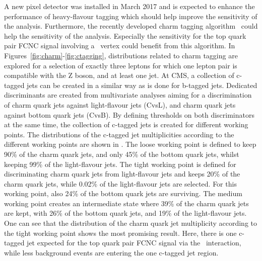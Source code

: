 A new pixel detector was installed in March 2017 and is expected to enhance the performance of heavy-flavour tagging which should help improve the sensitivity of the analysis. Furthermore, the recently developed charm tagging algorithm~\cite{CMS-PAS-BTV-16-001} could help the sensitivity of the analysis.  Especially  the sensitivity for the top quark pair FCNC signal involving a \Zct\ vertex could benefit from this algorithm. In Figures~\ref{fig:charm}-\ref{fig:ctagging},  distributions related to charm tagging are explored for a selection of exactly three leptons for which one lepton pair is compatible with the Z boson, and at least one jet. At CMS, a collection of c-tagged jets can be created in a similar way as is done for b-tagged jets. Dedicated discriminants are created from multivariate analyses aiming for a discrimination of charm quark jets against light-flavour jets (CvsL),  and charm quark jets against bottom quark jets (CvsB). By defining thresholds on both discriminators at the same time, the collection of c-tagged jets is created for different working points. The distributions of the c-tagged jet multiplicities according to the different working points are shown in . The loose working point is defined to keep 90\% of the charm quark jets, and only 45\% of the bottom quark jets, whilst keeping 99\% of the light-flavour jets. The tight working point is defined for discriminating charm quark jets from light-flavour jets and keeps 20\% of the charm quark jets, while 0.02\% of the light-flavour jets are selected. For this working point, also 24\% of the bottom quark jets are surviving. The medium working point creates an intermediate state where 39\% of the charm quark jets are kept, with 26\% of the bottom quark jets, and 19\% of the light-flavour jets. One can see that the distribution of the charm quark jet multiplicity according to the tight working point shows the most promising result. Here, there is one c-tagged jet expected for the top quark pair FCNC signal via the \Zct\ interaction, while less background events are entering the one c-tagged jet region.


